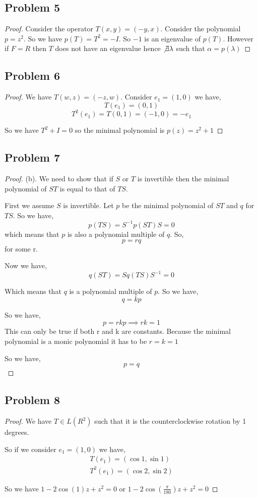 \documentclass[a4paper]{report}
\begin{document}
\subsection*{Problem 5}
\begin{proof}
   Consider the operator $T(x,y) = (-y,x)$. Consider the polynomial  $p = z^2$. So we have $p(T) = T^2 = -I$. So $-1$ is an eigenvalue of $p(T)$. However if $F = R$ then $T$ does not have an eigenvalue hence $\not \exists \lambda$ such that  $\alpha = p(\lambda)$
\end{proof}

\subsection*{Problem 6}

\begin{proof}
   We have $T(w,z) = (-z,w)$. Consider $e_1 = (1,0)$ we have, 
   $$ T(e_1) = (0,1) $$ 
   $$ T^2(e_1) = T(0,1) =  (-1,0) = -e_1 $$ 

   So we have $T^2 + I = 0$ so the minimal polynomial is $p(z) = z^2 + 1$
\end{proof}

\subsection*{Problem 7}
\begin{proof}
   (b). We need to show that if $S$ or $T$ is invertible then the minimal polynomial of $ST$ is equal to that of $TS$.

   First we assume $S$ is invertible. Let $p$ be the minimal polynomial of $ST$ and $q$ for $TS$. So we have,  
   $$ p(TS) = S^{-1}p(ST)S  = 0$$  which means that $p$ is also a polynomial multiple of $q$. So, 
   $$ p = rq $$ for some r.


   Now we have, 
   $$ q(ST) = Sq(TS)S^{-1} = 0 $$ 

   Which means that $q$ is a polynomial multiple of $p$. So we have, 
   $$ q = kp $$ 

   So we have, 
   $$ p = rkp \implies rk = 1 $$ 
   This can only be true if both  r and k are constants. Because the minimal polynomial is a monic polynomial it has to be $r = k = 1$ 

   So we have, 
   $$ p = q $$ 
\end{proof}

\subsection*{Problem 8}
\begin{proof}
   We have $T \in L(R^2)$ such that it is the counterclockwise rotation by 1 degrees.

   So  if we consider $e_1 = (1,0)$ we have, 
   \begin{align*}
      T(e_1) = (\cos 1, \sin 1)\\
      T^2(e_1) = (\cos 2, \sin 2)
   \end{align*}

   So we have $1 - 2\cos(1)z + z^2 = 0$ or $1 - 2\cos(\frac{\pi}{180})z + z^2 = 0$
\end{proof}
\end{document}
